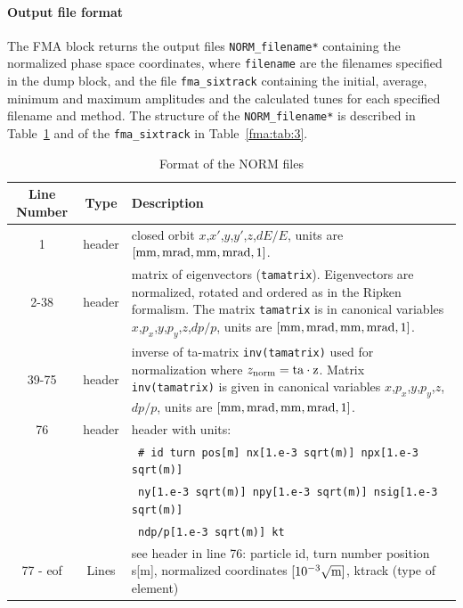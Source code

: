 \documentclass[a4paper,11pt]{report}
\begin{document}
\paragraph{Output file format}
The FMA block returns the output files \verb|NORM_filename*| containing the normalized phase space coordinates, where \verb|filename| are the filenames specified in the dump block, and the file \verb|fma_sixtrack| containing the initial, average, minimum and maximum amplitudes and the calculated tunes for each specified filename and method. The structure of the \verb|NORM_filename*| is described in Table~\ref{fma:tab:2} and of the \verb|fma_sixtrack| in Table~\ref{fma:tab:3}.
\begin{table}[H]
	\begin{center}
	\caption{Format of the NORM files}\label{fma:tab:2}
	\begin{tabularx}{\textwidth}{|c|c|X|}
		\hline
		{\bf Line Number} & {\bf Type} & {\bf Description} \\
		\hline
		1 & header & closed orbit  $x$,$x'$,$y$,$y'$,$z$,$dE/E$, units are $[\rm mm,mrad,mm,mrad,1]$. \\\hline
		2-38 & header & matrix of eigenvectors (\texttt{tamatrix}). Eigenvectors are normalized, rotated and ordered as in the Ripken formalism. The matrix \texttt{tamatrix} is in canonical variables $x$,$p_x$,$y$,$p_y$,$z$,$dp/p$, units are $[\rm mm,mrad,mm,mrad,1]$. \\\hline
		39-75 & header & inverse of ta-matrix \texttt{inv(tamatrix)} used for normalization where \hbox{$z_{\rm norm}=\rm{ta}\cdot z$}. Matrix \texttt{inv(tamatrix)} is given in canonical variables $x$,$p_x$,$y$,$p_y$,$z$,$dp/p$, units are $[\rm mm,mrad,mm,mrad,1]$.\\\hline
		76 & header & header with units:\\
		& & \verb| # id turn pos[m] nx[1.e-3 sqrt(m)] npx[1.e-3 sqrt(m)]| \\
		& & \quad \verb| ny[1.e-3 sqrt(m)] npy[1.e-3 sqrt(m)] nsig[1.e-3 sqrt(m)] |\\
		& & \quad \verb| ndp/p[1.e-3 sqrt(m)] kt| \\\hline
		77 - eof & Lines & see header in line 76: particle id, turn number position s[m], normalized coordinates $[10^{-3} \sqrt{\rm m}]$, ktrack (type of element)\\\hline
	\end{tabularx}
\end{center}
\end{table}
\end{document}
